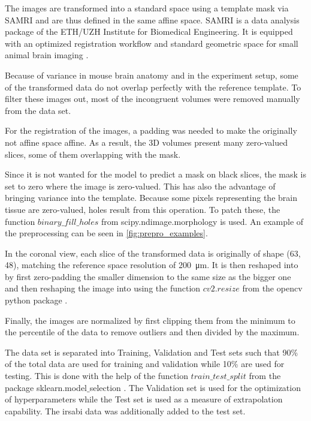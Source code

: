 The images are transformed into a standard space using a template mask via SAMRI \cite{noauthor_ibt-fmi/samri_2019} and are thus defined in the same affine space.
SAMRI is a data analysis package of the ETH/UZH Institute for Biomedical Engineering.
It is equipped with an optimized registration workflow and standard geometric space for small animal brain imaging \cite{ioanas_optimized_2019}.

Because of variance in mouse brain anatomy and in the experiment setup, some of the transformed data do not overlap perfectly with the reference template.
To filter these images out, most of the incongruent volumes were removed manually from the data set.

For the registration of the images, a padding was needed to make the originally not affine space affine.
As a result, the 3D volumes present many zero-valued slices, some of them overlapping with the mask.

Since it is not wanted for the model to predict a mask on black slices, the mask is set to zero where the image is zero-valued.
This has also the advantage of bringing variance into the template.
Because some pixels representing the brain tissue are zero-valued, holes result from this operation.
To patch these, the function \textcolor{mg}{\texttt{$binary\_fill\_holes$}} from scipy.ndimage.morphology \cite{noauthor_multi-dimensional_nodate} is used.
An example of the preprocessing can be seen in \cref{fig:prepro_examples}.

In the coronal view, each slice of the transformed data is originally of shape (63, 48), matching the reference space resolution of \SI{200}{\micro\metre}.
It is then reshaped into  by first zero-padding the smaller dimension to the same size as the bigger one and then reshaping the image into  using the function \textcolor{mg}{\texttt{$cv2.resize$}} from the opencv python package \cite{noauthor_opencv-python_nodate}.

Finally, the images are normalized by first clipping them from the minimum to the  percentile of the data to remove outliers and then divided by the maximum.

The data set is separated into Training, Validation and Test sets such that 90\% of the total data are used for training and validation while 10\% are used for testing.
This is done with the help of the function \textcolor{mg}{\texttt{$train\_test\_split$}} from the package sklearn.model$\_$selection \cite{scikit-learn}.
The Validation set is used for the optimization of hyperparameters while the Test set is used as a measure of extrapolation capability.
The irsabi data was additionally added to the test set.

